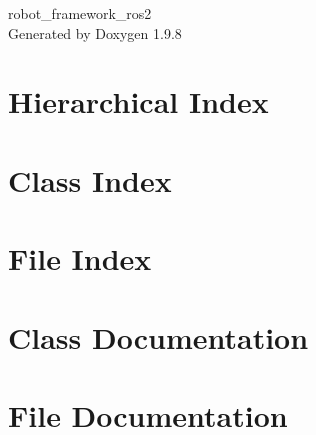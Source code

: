 \documentclass[twoside]{book}
\newcommand{\+}{\discretionary{\mbox{\scriptsize$\hookleftarrow$}}{}{}}
\newcommand{\clearemptydoublepage}{%
    \newpage{\pagestyle{empty}\cleardoublepage}%
  }
\begin{document}
  \raggedbottom
    \hypersetup{pageanchor=false,
                bookmarksnumbered=true,
                pdfencoding=unicode
               }
  \begin{titlepage}
  \vspace*{7cm}
  \begin{center}%
  {\Large robot\+\_\+framework\+\_\+ros2}\\
  \vspace*{1cm}
  {\large Generated by Doxygen 1.9.8}\\
  \end{center}
  \end{titlepage}
  \clearemptydoublepage
  \tableofcontents
  \clearemptydoublepage
  \hypersetup{pageanchor=true}


\chapter{Hierarchical Index}

\chapter{Class Index}

\chapter{File Index}

\chapter{Class Documentation}



\chapter{File Documentation}

  \backmatter
  \newpage
  \clearemptydoublepage
  \printindex
\end{document}
